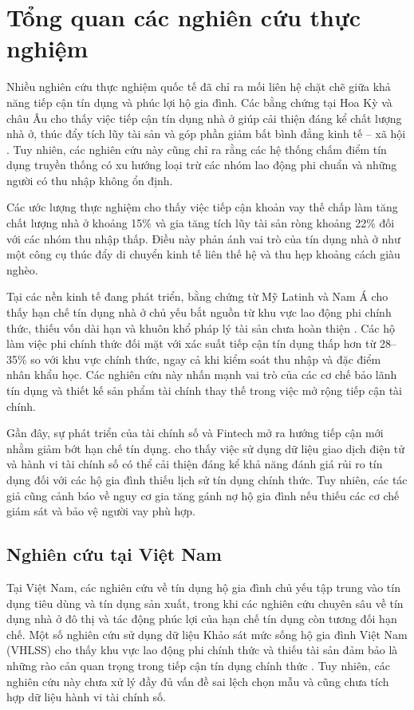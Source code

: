 \documentclass[12pt,a4paper]{report}
\begin{document}
\section{Tổng quan các nghiên cứu thực nghiệm}

Nhiều nghiên cứu thực nghiệm quốc tế đã chỉ ra mối liên hệ chặt chẽ giữa khả năng tiếp cận tín dụng và phúc lợi hộ gia đình. Các bằng chứng tại Hoa Kỳ và châu Âu cho thấy việc tiếp cận tín dụng nhà ở giúp cải thiện đáng kể chất lượng nhà ở, thúc đẩy tích lũy tài sản và góp phần giảm bất bình đẳng kinh tế -- xã hội \parencite{UrbanInstitute2024,policydebate2025_equity}. Tuy nhiên, các nghiên cứu này cũng chỉ ra rằng các hệ thống chấm điểm tín dụng truyền thống có xu hướng loại trừ các nhóm lao động phi chuẩn và những người có thu nhập không ổn định.

Các ước lượng thực nghiệm cho thấy việc tiếp cận khoản vay thế chấp làm tăng chất lượng nhà ở khoảng 15\% và gia tăng tích lũy tài sản ròng khoảng 22\% đối với các nhóm thu nhập thấp. Điều này phản ánh vai trò của tín dụng nhà ở như một công cụ thúc đẩy di chuyển kinh tế liên thế hệ và thu hẹp khoảng cách giàu nghèo.

Tại các nền kinh tế đang phát triển, bằng chứng từ Mỹ Latinh và Nam Á cho thấy hạn chế tín dụng nhà ở chủ yếu bắt nguồn từ khu vực lao động phi chính thức, thiếu vốn dài hạn và khuôn khổ pháp lý tài sản chưa hoàn thiện \parencite{arrieta2005Mortgage,sharma2024saving}. Các hộ làm việc phi chính thức đối mặt với xác suất tiếp cận tín dụng thấp hơn từ 28--35\% so với khu vực chính thức, ngay cả khi kiểm soát thu nhập và đặc điểm nhân khẩu học. Các nghiên cứu này nhấn mạnh vai trò của các cơ chế bảo lãnh tín dụng và thiết kế sản phẩm tài chính thay thế trong việc mở rộng tiếp cận tài chính.

Gần đây, sự phát triển của tài chính số và Fintech mở ra hướng tiếp cận mới nhằm giảm bớt hạn chế tín dụng. \textcite{Yue2022DigitalCredit} cho thấy việc sử dụng dữ liệu giao dịch điện tử và hành vi tài chính số có thể cải thiện đáng kể khả năng đánh giá rủi ro tín dụng đối với các hộ gia đình thiếu lịch sử tín dụng chính thức. Tuy nhiên, các tác giả cũng cảnh báo về nguy cơ gia tăng gánh nợ hộ gia đình nếu thiếu các cơ chế giám sát và bảo vệ người vay phù hợp.
\subsection{Nghiên cứu tại Việt Nam}

Tại Việt Nam, các nghiên cứu về tín dụng hộ gia đình chủ yếu tập trung vào tín dụng tiêu dùng và tín dụng sản xuất, trong khi các nghiên cứu chuyên sâu về tín dụng nhà ở đô thị và tác động phúc lợi của hạn chế tín dụng còn tương đối hạn chế. Một số nghiên cứu sử dụng dữ liệu Khảo sát mức sống hộ gia đình Việt Nam (VHLSS) cho thấy khu vực lao động phi chính thức và thiếu tài sản đảm bảo là những rào cản quan trọng trong tiếp cận tín dụng chính thức \parencite{SBV2023,TapChiNganHang2023}. Tuy nhiên, các nghiên cứu này chưa xử lý đầy đủ vấn đề sai lệch chọn mẫu và cũng chưa tích hợp dữ liệu hành vi tài chính số.
\end{document}
